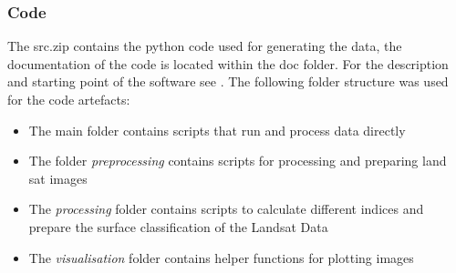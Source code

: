 \documentclass[12pt,a4paper, english,twoside]{scrartcl}
\begin{document}
  \subsubsection{Code}\label{sec:code}
      The src.zip contains the python code used for generating the data, the documentation of the code is located within the doc folder.
      For the description and starting point of the software see .
      The following folder structure was used for the code artefacts:
      \begin{itemize}
        \item The main folder contains scripts that run and process data directly
        \item The folder \textit{preprocessing} contains scripts for processing and preparing land sat images
        \item The \textit{processing} folder contains scripts to calculate different indices and prepare the surface classification of the Landsat Data
        \item The \textit{visualisation} folder contains helper functions for plotting images 
      \end{itemize}
\newpage
\printbibliography%
\newpage
{}
\end{document}
